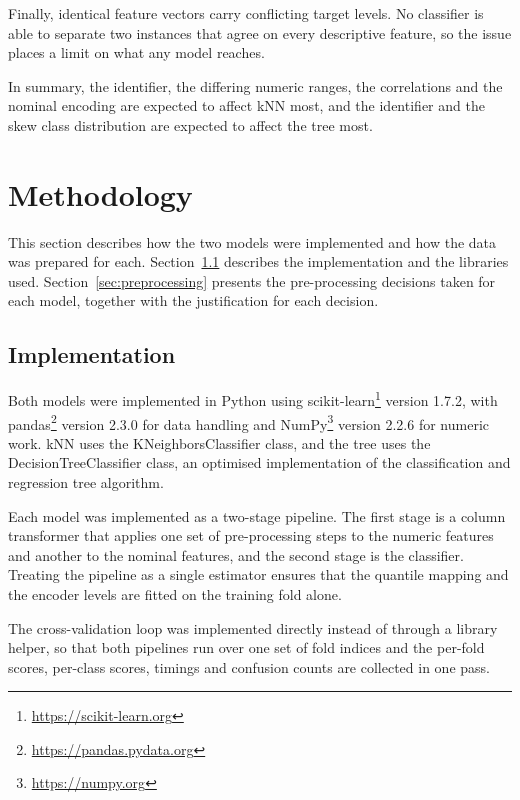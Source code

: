\documentclass[conference]{IEEEtran}
\begin{document}
Finally, identical feature vectors carry conflicting target levels. No
classifier is able to separate two instances that agree on every descriptive
feature, so the issue places a limit on what any model reaches.

In summary, the identifier, the differing numeric ranges, the correlations and
the nominal encoding are expected to affect kNN most, and the identifier and the
skew class distribution are expected to affect the tree most. 
\section{Methodology}
\label{sec:method}

This section describes how the two models were implemented and how the data was
prepared for each. Section~\ref{sec:implementation} describes the implementation
and the libraries used. Section~\ref{sec:preprocessing} presents the
pre-processing decisions taken for each model, together with the justification
for each decision.

\subsection{Implementation}
\label{sec:implementation}

Both models were implemented in Python using
scikit-learn\footnote{\url{https://scikit-learn.org}} version 1.7.2, with
pandas\footnote{\url{https://pandas.pydata.org}} version 2.3.0 for data handling
and NumPy\footnote{\url{https://numpy.org}} version 2.2.6 for numeric work. kNN
uses the KNeighborsClassifier class, and the tree uses the
DecisionTreeClassifier class, an optimised implementation of the
classification and regression tree algorithm.

Each model was implemented as a two-stage pipeline. The first stage is a column
transformer that applies one set of pre-processing steps to the numeric
features and another to the nominal features, and the second stage is the
classifier. Treating the pipeline as a single estimator ensures that the
quantile mapping and the encoder levels are fitted on the training fold alone.

The cross-validation loop was implemented directly instead of through a library
helper, so that both pipelines run over one set of fold indices and the
per-fold scores, per-class scores, timings and confusion counts are collected
in one pass.
\end{document}
